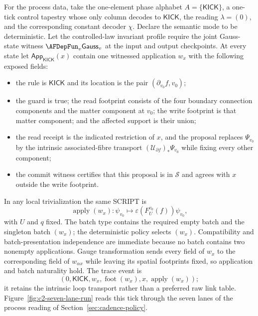\begin{example}
For the process data, take the one-element phase alphabet
$A=\{\mathsf{KICK}\}$, a one-tick control tapestry whose only column decodes
to $\mathsf{KICK}$, the reading $\lambda=(0)$, and the corresponding constant
decoder $\chi$.  Declare the semantic mode to be deterministic.  Let the
controlled-law invariant profile require the joint Gauss-state witness
$\AFDepFun_v\mathsf{Gauss}_v$ at the input and output checkpoints.  At every state let
$\mathsf{App}_{\mathsf{KICK}}(x)$ contain one witnessed application
$w_x$ with the following exposed fields:
\begin{itemize}[leftmargin=2.2em]
\item the rule is $\mathsf{KICK}$ and its location is the pair
      $(\partial_{v_0}f,v_0)$;
\item the guard is true; the read footprint consists of the four boundary
      connection components and the matter component at $v_0$; the write
      footprint is that matter component; and the affected support is their
      union;
\item the read receipt is the indicated restriction of $x$, and the proposal
      replaces $\Psi_{v_0}$ by the intrinsic associated-fibre transport
      $(\mathcal U_{\partial f})_*\Psi_{v_0}$ while fixing every other
      component;
\item the commit witness certifies that this proposal is in $\mathcal S$ and
      agrees with $x$ outside the write footprint.
\end{itemize}
In any local trivialization the same SCRIPT is
\[
 \operatorname{apply}(w_x):
 \psi_{v_0}\longmapsto
 \varepsilon(F_U^{v_0}(f))\psi_{v_0},
\]
with $U$ and $q$ fixed.  The batch type contains the required empty batch and
the singleton batch $(w_x)$; the deterministic policy selects $(w_x)$.
Compatibility and batch-presentation independence are immediate because no
batch contains two nonempty applications.  Gauge transformation sends every
field of $w_x$ to the corresponding field of $w_{\alpha x}$ while leaving its
spatial footprints fixed, so application and batch naturality hold.  The trace
event is
\[
 (0,\mathsf{KICK},w_x,\operatorname{foot}(w_x),x,
                  \operatorname{apply}(w_x));
\]
it retains the intrinsic loop transport rather than a preferred raw link
table.  Figure~\ref{fig:c2-seven-lane-run} reads this tick through the seven
lanes of the process reading of Section~\ref{sec:cadence-policy}.


\end{example}
